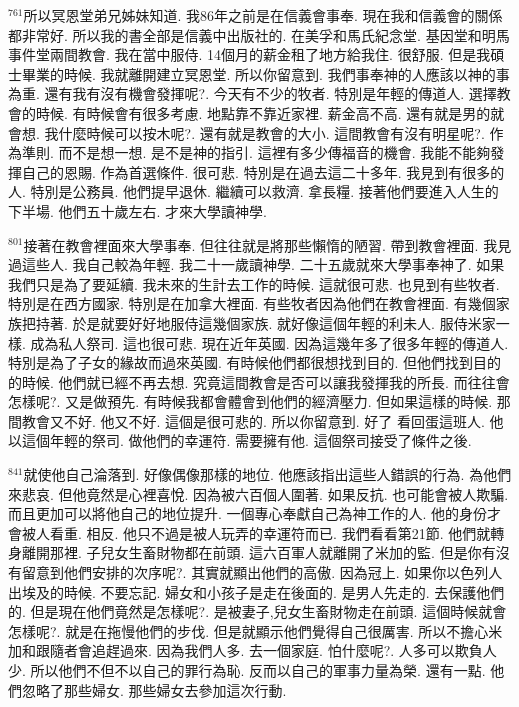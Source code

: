 \documentclass{book}
\begin{document}
$^{761}$所以冥恩堂弟兄姊妹知道.
我86年之前是在信義會事奉.
現在我和信義會的關係都非常好.
所以我的書全部是信義中出版社的.
在美孚和馬氏紀念堂.
基因堂和明馬事件堂兩間教會.
我在當中服侍.
14個月的薪金租了地方給我住.
很舒服.
但是我碩士畢業的時候.
我就離開建立冥恩堂.
所以你留意到.
我們事奉神的人應該以神的事為重.
還有我有沒有機會發揮呢?.
今天有不少的牧者.
特別是年輕的傳道人.
選擇教會的時候.
有時候會有很多考慮.
地點靠不靠近家裡.
薪金高不高.
還有就是男的就會想.
我什麼時候可以按木呢?.
還有就是教會的大小.
這間教會有沒有明星呢?.
作為準則.
而不是想一想.
是不是神的指引.
這裡有多少傳福音的機會.
我能不能夠發揮自己的恩賜.
作為首選條件.
很可悲.
特別是在過去這二十多年.
我見到有很多的人.
特別是公務員.
他們提早退休.
繼續可以救濟.
拿長糧.
接著他們要進入人生的下半場.
他們五十歲左右.
才來大學讀神學.

$^{801}$接著在教會裡面來大學事奉.
但往往就是將那些懶惰的陋習.
帶到教會裡面.
我見過這些人.
我自己較為年輕.
我二十一歲讀神學.
二十五歲就來大學事奉神了.
如果我們只是為了要延續.
我未來的生計去工作的時候.
這就很可悲.
也見到有些牧者.
特別是在西方國家.
特別是在加拿大裡面.
有些牧者因為他們在教會裡面.
有幾個家族把持著.
於是就要好好地服侍這幾個家族.
就好像這個年輕的利未人.
服侍米家一樣.
成為私人祭司.
這也很可悲.
現在近年英國.
因為這幾年多了很多年輕的傳道人.
特別是為了子女的緣故而過來英國.
有時候他們都很想找到目的.
但他們找到目的的時候.
他們就已經不再去想.
究竟這間教會是否可以讓我發揮我的所長.
而往往會怎樣呢?.
又是做預先.
有時候我都會體會到他們的經濟壓力.
但如果這樣的時候.
那間教會又不好.
他又不好.
這個是很可悲的.
所以你留意到.
好了 看回蛋這班人.
他以這個年輕的祭司.
做他們的幸運符.
需要擁有他.
這個祭司接受了條件之後.

$^{841}$就使他自己淪落到.
好像偶像那樣的地位.
他應該指出這些人錯誤的行為.
為他們來悲哀.
但他竟然是心裡喜悅.
因為被六百個人圍著.
如果反抗.
也可能會被人欺騙.
而且更加可以將他自己的地位提升.
一個專心奉獻自己為神工作的人.
他的身份才會被人看重.
相反.
他只不過是被人玩弄的幸運符而已.
我們看看第21節.
他們就轉身離開那裡.
子兒女生畜財物都在前頭.
這六百軍人就離開了米加的監.
但是你有沒有留意到他們安排的次序呢?.
其實就顯出他們的高傲.
因為冠上.
如果你以色列人出埃及的時候.
不要忘記.
婦女和小孩子是走在後面的.
是男人先走的.
去保護他們的.
但是現在他們竟然是怎樣呢?.
是被妻子,兒女生畜財物走在前頭.
這個時候就會怎樣呢?.
就是在拖慢他們的步伐.
但是就顯示他們覺得自己很厲害.
所以不擔心米加和跟隨者會追趕過來.
因為我們人多.
去一個家庭.
怕什麼呢?.
人多可以欺負人少.
所以他們不但不以自己的罪行為恥.
反而以自己的軍事力量為榮.
還有一點.
他們忽略了那些婦女.
那些婦女去參加這次行動.
\end{document}
